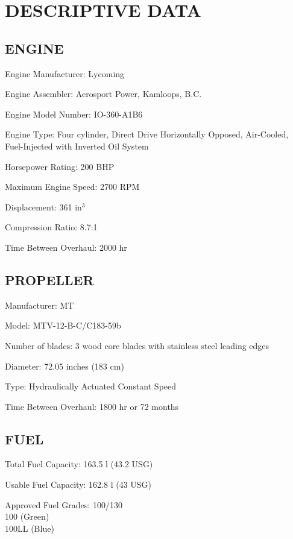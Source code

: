 \section{DESCRIPTIVE DATA} 
\subsection{ENGINE} 
\begin{Description}
	\item[Engine Manufacturer:] Lycoming 
	\item[Engine Assembler:] Aerosport Power, Kamloops, B.C. 
	\item[Engine Model Number:] IO-360-A1B6 
	\item[Engine Type:] Four cylinder, Direct Drive Horizontally Opposed, Air-Cooled, Fuel-Injected with Inverted Oil System 
	\item[Horsepower Rating:] 200 BHP 
	\item[Maximum Engine Speed:]2700 RPM 
	\item[Displacement:] 361 $\mathrm{in^{3}}$ 
	\item[Compression Ratio:] 8.7:1 
	\item[Time Between Overhaul:] 2000 hr 
\end{Description}

\subsection{PROPELLER} 
\begin{Description}
	\item[Manufacturer:] MT 
	\item[Model:] MTV-12-B-C/C183-59b 
	\item[Number of blades:] 3 wood core blades with stainless steel leading edges
	\item[Diameter:] 72.05 inches (183 cm)
	\item[Type:] Hydraulically Actuated Constant Speed 
	\item[Time Between Overhaul:] 1800 hr or 72 months 
\end{Description}

\subsection{FUEL} 
\begin{Description}
	\item[Total Fuel Capacity:] 163.5 l (43.2 USG) 
	\item[Usable Fuel Capacity:] 162.8 l (43 USG)
	\item[Approved Fuel Grades:] 100/130\\
	100 (Green)\\
	100LL (Blue) 
\end{Description}

